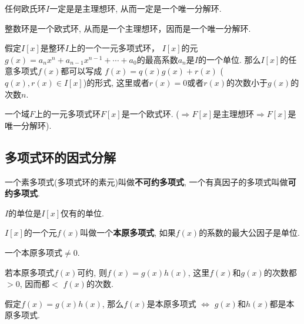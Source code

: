 \begin{Theorem}
任何欧氏环$I$一定是是主理想环, 从而一定是一个唯一分解环.
\end{Theorem}

\begin{Note}
整数环是一个欧式环, 从而是一个主理想环，因而是一个唯一分解环.
\end{Note}

\begin{Lemma}
假定$I[x]$是整环$I$上的一个一元多项式环， $I[x]$的元$g(x) = a_n x^n + a_{n-1} x^{n-1} +\cdots + a_0$的最高系数$a_n$是$I$的一个单位. 那么$I[x]$的任意多项式$f(x)$都可以写成
$f(x) = q(x) g(x) + r(x)$ ($q(x), r(x) \in I[x]$)的形式, 这里或者$r(x) = 0$或者$r(x)$的次数小于$g(x)$的次数$n$.
\end{Lemma}

\begin{Theorem}[!]
一个域$F$上的一元多项式环$F[x]$是一个欧式环. ($\Rightarrow F[x]$是主理想环$\Rightarrow F[x]$是唯一分解环).
\end{Theorem}

\subsection{多项式环的因式分解} %

\begin{Definition}
一个素多项式(多项式环的素元)叫做\textbf{不可约多项式}, 一个有真因子的多项式叫做\textbf{可约多项式}.
\end{Definition}

\begin{Proposition}
$I$的单位是$I[x]$仅有的单位.
\end{Proposition}

\begin{Definition}[本原多项式]
$I[x]$的一个元$f(x)$叫做一个\textbf{本原多项式}, 如果$f(x)$的系数的最大公因子是单位.
\end{Definition}

\begin{Proposition}
一个本原多项式$\neq \mathfrak{0}$.
\end{Proposition}

\begin{Proposition}
若本原多项式$f(x)$可约, 则$f(x) = g(x) h(x)$, 这里$f(x)$和$g(x)$的次数都$> 0$, 因而都$<$
$f(x)$的次数.
\end{Proposition}

\begin{Lemma}
假定$f(x) = g(x) h(x)$, 那么$f(x)$是本原多项式 $\Leftrightarrow$ $g(x)$和$h(x)$都是本原多项式.
\end{Lemma}

